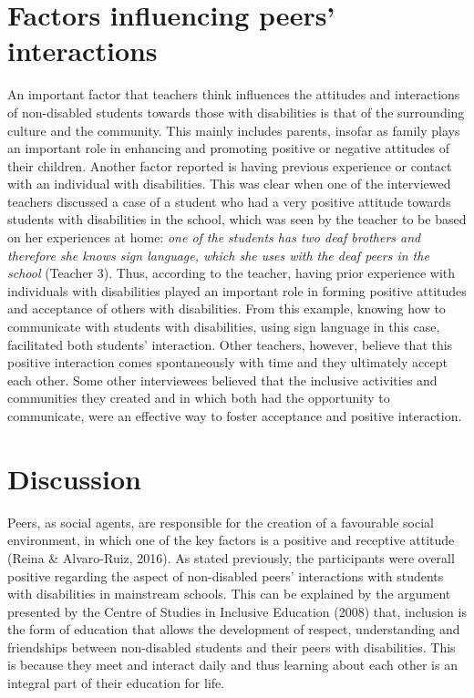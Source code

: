 \documentclass[11.5pt]{sig-alternate}
\begin{document}
\begin{large}
\section*{Factors influencing peers’ interactions}
An important factor that teachers think influences the attitudes and interactions of non-disabled students towards those with disabilities is that of the surrounding culture and the community. This mainly includes parents, insofar as family plays an important role in enhancing and promoting positive or negative attitudes of their children. Another factor reported is having previous experience or contact with an individual with disabilities. This was clear when one of the interviewed teachers discussed a case of a student who had a very positive attitude towards students with disabilities in the school, which was seen by the teacher to be based on her experiences at home: \textit{one of the students has two deaf brothers and therefore she knows sign language, which she uses with the deaf peers in the school} (Teacher 3). Thus, according to the teacher, having prior experience with individuals with disabilities played an important role in forming positive attitudes and acceptance of others with disabilities. From this example, knowing how to communicate with students with disabilities, using sign language in this case, facilitated both students’ interaction. Other teachers, however, believe that this positive interaction comes spontaneously with time and they ultimately accept each other. Some other interviewees believed that the inclusive activities and communities they created and in which both had the opportunity to communicate, were an effective way to foster acceptance and positive interaction. 

\section*{Discussion}
Peers, as social agents, are responsible for the creation of a favourable social environment, in which one of the key factors is a positive and receptive attitude (Reina  \& Alvaro-Ruiz, 2016). As stated previously, the participants were overall positive regarding the aspect of non-disabled peers’ interactions with students with disabilities in mainstream schools. This can be explained by the argument presented by the Centre of Studies in Inclusive Education (2008) that, inclusion is the form of education that allows the development of respect, understanding and friendships between non-disabled students and their peers with disabilities. This is because they meet and interact daily and thus learning about each other is an integral part of their education for life. 


\end{large}
\end{document}
